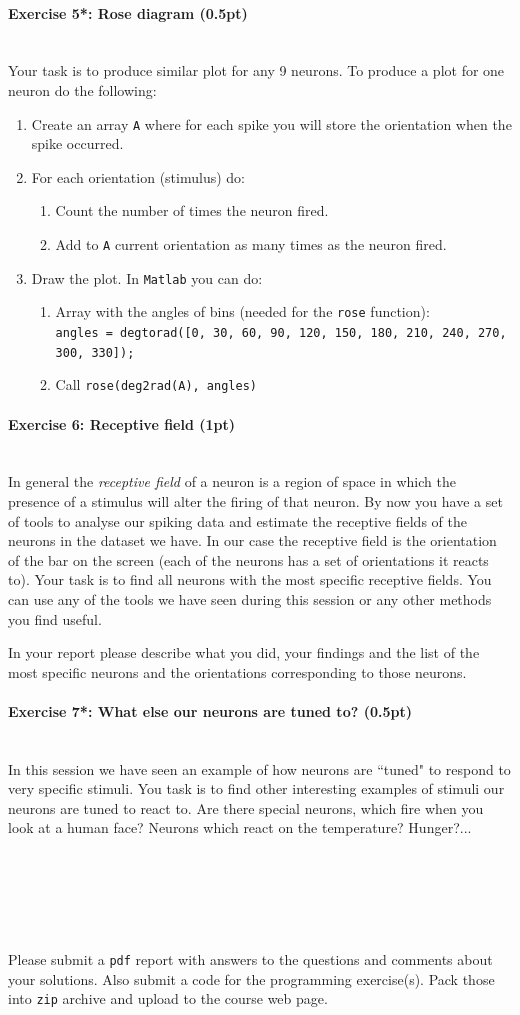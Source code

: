 \documentclass[a4paper,11pt]{article}
\newenvironment{exercise}[3]{\paragraph{Exercise #1: #2 (#3pt)}\ \\}{
\medskip}
\begin{document}
\begin{exercise}{5*}{Rose diagram}{0.5}
Your task is to produce similar plot for any 9 neurons. To produce a plot for one neuron do the following:
\begin{enumerate}
	\item Create an array \texttt{A} where for each spike you will store the orientation when the spike occurred.
	\item For each orientation (stimulus) do:
	\begin{enumerate}
		\item Count the number of times the neuron fired.
		\item Add to \texttt{A} current orientation as many times as the neuron fired.
	\end{enumerate}
	\item Draw the plot. In \texttt{Matlab} you can do:
	\begin{enumerate}
		\item Array with the angles of bins (needed for the \texttt{rose} function):\\ \texttt{angles = degtorad([0, 30, 60, 90, 120, 150, 180, 210, 240, 270, 300, 330]);}
		\item Call \texttt{rose(deg2rad(A), angles)}
	\end{enumerate}
\end{enumerate}
\end{exercise}


\begin{exercise}{6}{Receptive field}{1}
In general the \emph{receptive field} of a neuron is a region of space in which the presence of a stimulus will alter the firing of that neuron. By now you have a set of tools to analyse our spiking data and estimate the receptive fields of the neurons in the dataset we have. In our case the receptive field is the orientation of the bar on the screen (each of the neurons has a set of orientations it reacts to). Your task is to find all neurons with the most specific receptive fields. You can use any of the tools we have seen during this session or any other methods you find useful.

In your report please describe what you did, your findings and the list of the most specific neurons and the orientations corresponding to those neurons.
\end{exercise}


\begin{exercise}{7*}{What else our neurons are tuned to?}{0.5}
In this session we have seen an example of how neurons are ``tuned" to respond to very specific stimuli. You task is to find  other interesting examples of stimuli our neurons are tuned to react to. Are there special neurons, which fire when you look at a human face? Neurons which react on the temperature? Hunger?...
\end{exercise}



\ \\
\ \\
\ \\
\ \\
\ \\
Please submit a \texttt{pdf} report with answers to the questions and comments about your solutions. Also submit a code for the programming exercise(s). Pack those into \texttt{zip} archive and upload to the course web page.
\end{document}
